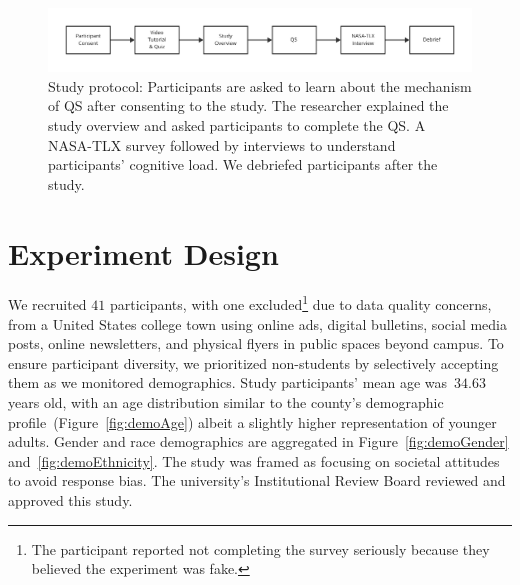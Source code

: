 \begin{figure}[ht!]
    \centering
    \includegraphics[width=1\textwidth]{content/image/study_flow.pdf}
    \caption{Study protocol: Participants are asked to learn about the mechanism of QS after consenting to the study. The researcher explained the study overview and asked participants to complete the QS. A NASA-TLX survey followed by interviews to understand participants' cognitive load. We debriefed participants after the study.}

    \label{fig:studyProtocol}
\end{figure}

\section{Experiment Design}
\label{sec:experiment}
We recruited $41$ participants, with one excluded\footnote{The participant reported not completing the survey seriously because they believed the experiment was fake.} due to data quality concerns, from a United States college town using online ads, digital bulletins, social media posts, online newsletters, and physical flyers in public spaces beyond campus. To ensure participant diversity, we prioritized non-students by selectively accepting them as we monitored demographics. Study participants' mean age was~$34.63$ years old, with an age distribution similar to the county's demographic profile~(Figure~\ref{fig:demoAge}) albeit a slightly higher representation of younger adults. Gender and race demographics are aggregated in Figure~\ref{fig:demoGender} and~\ref{fig:demoEthnicity}. The study was framed as focusing on societal attitudes to avoid response bias. The university's Institutional Review Board reviewed and approved this study. 

